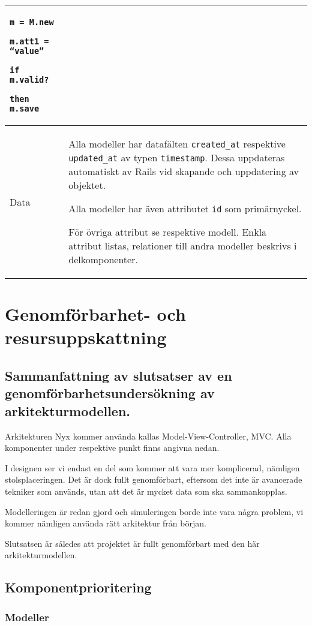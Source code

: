 \documentclass[a4paper, twoside, 11pt, titlepage]{article}
\begin{document}
\begin {table} [ht]
\begin{tabular} {  p{3.5cm} p{9.6cm} }
{{\tt m = M.new}

{\tt m.att1 = ``value''}

{\tt if m.valid?}

{\tt then m.save}} \\
				\hline
				{Data} & {Alla modeller har datafälten {\tt created\_at} respektive {\tt updated\_at} av typen {\tt timestamp}. Dessa uppdateras automatiskt av Rails vid skapande och uppdatering av objektet.

Alla modeller har även attributet {\tt id} som primärnyckel.

För övriga attribut se respektive modell. Enkla attribut listas, relationer till andra modeller beskrivs i delkomponenter.} \\
				\hline
			\end{tabular} \end{table} \FloatBarrier


\clearpage
\section{Genomförbarhet- och resursuppskattning}



	\subsection{Sammanfattning av slutsatser av en genomförbarhetsundersökning av arkitekturmodellen.}


	Arkitekturen Nyx kommer använda kallas Model-View-Controller, MVC. Alla komponenter under respektive punkt finns angivna nedan.

	I designen ser vi endast en del som kommer att vara mer komplicerad, nämligen stolsplaceringen. Det är dock fullt genomförbart, eftersom det inte är avancerade tekniker som används, utan att det är mycket data som ska sammankopplas.

	Modelleringen är redan gjord och simuleringen borde inte vara några problem, vi kommer nämligen använda rätt arkitektur från början.

	Slutsatsen är således att projektet är fullt genomförbart med den här arkitekturmodellen.

	\subsection{Komponentprioritering}



		\subsubsection{Modeller}
\end{document}
